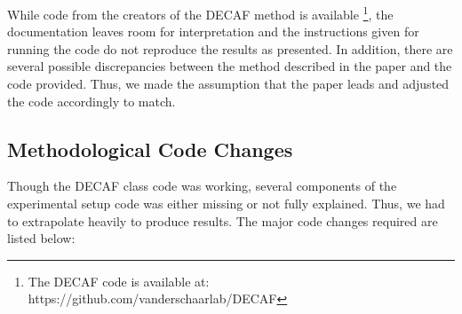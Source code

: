 While code from the creators of the DECAF method is available \footnote{The DECAF code is available at: https://github.com/vanderschaarlab/DECAF}, the documentation leaves room for interpretation and the instructions given for running the code do not reproduce the results as presented. In addition, there are several possible discrepancies between the method described in the paper and the code provided. Thus, we made the assumption that the paper leads and adjusted the code accordingly to match.

\subsection{Methodological Code Changes}
\label{sec:changes}
Though the DECAF class code was working, several components of the experimental setup code was either missing or not fully explained. Thus, we had to extrapolate heavily to produce results. The major code changes required are listed below:
